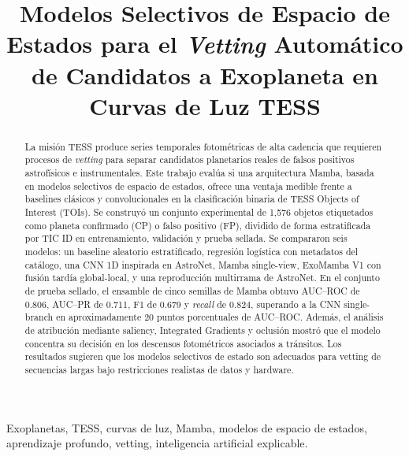 \documentclass[conference]{IEEEtran}
\newcommand{\aucroc}{AUC--ROC}
\newcommand{\aucpr}{AUC--PR}
\begin{document}
\title{Modelos Selectivos de Espacio de Estados para el \textit{Vetting} Automático de Candidatos a Exoplaneta en Curvas de Luz TESS}

\author{
}

\maketitle

\begin{abstract}
La misión TESS produce series temporales fotométricas de alta cadencia que requieren procesos de \textit{vetting} para separar candidatos planetarios reales de falsos positivos astrofísicos e instrumentales. Este trabajo evalúa si una arquitectura Mamba, basada en modelos selectivos de espacio de estados, ofrece una ventaja medible frente a baselines clásicos y convolucionales en la clasificación binaria de TESS Objects of Interest (TOIs). Se construyó un conjunto experimental de 1,576 objetos etiquetados como planeta confirmado (CP) o falso positivo (FP), dividido de forma estratificada por TIC ID en entrenamiento, validación y prueba sellada. Se compararon seis modelos: un baseline aleatorio estratificado, regresión logística con metadatos del catálogo, una CNN 1D inspirada en AstroNet, Mamba single-view, ExoMamba V1 con fusión tardía global-local, y una reproducción multirrama de AstroNet. En el conjunto de prueba sellado, el ensamble de cinco semillas de Mamba obtuvo \aucroc{} de 0.806, \aucpr{} de 0.711, F1 de 0.679 y \textit{recall} de 0.824, superando a la CNN single-branch en aproximadamente 20 puntos porcentuales de \aucroc{}. Además, el análisis de atribución mediante saliency, Integrated Gradients y oclusión mostró que el modelo concentra su decisión en los descensos fotométricos asociados a tránsitos. Los resultados sugieren que los modelos selectivos de estado son adecuados para vetting de secuencias largas bajo restricciones realistas de datos y hardware.
\end{abstract}

\begin{IEEEkeywords}
Exoplanetas, TESS, curvas de luz, Mamba, modelos de espacio de estados, aprendizaje profundo, vetting, inteligencia artificial explicable.
\end{IEEEkeywords}
\end{document}
